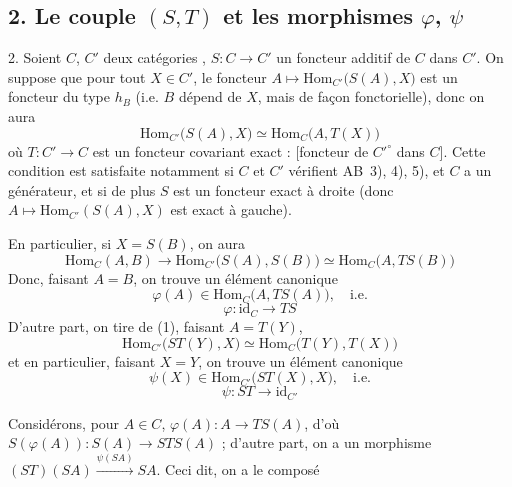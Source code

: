 \documentclass[11pt,a4paper]{article}
\begin{document}
\subsection*{2. Le couple $(S, T)$ et les morphismes $\varphi$, $\psi$}

2. Soient $C$, $C'$ deux catégories  ,
$S : C \to C'$ un foncteur additif de $C$ dans $C'$. On suppose que pour tout
 $X \in C'$, le foncteur
$A \mapsto \mathrm{Hom}_{C'}\bigl( S(A), X \bigr)$ est un foncteur du type
 $h_{B}$ (i.e. $B$ dépend de $X$, mais de façon
fonctorielle), donc on aura
\[
  \mathrm{Hom}_{C'}\bigl( S(A), X \bigr) \simeq
  \mathrm{Hom}_{C}\bigl( A, T(X) \bigr)
  \tag{1}
\]
où $T : C' \to C$ est un foncteur covariant exact : [foncteur de $C'^{\circ}$
dans $C$]. Cette condition est \struck{\ill{}} satisfaite notamment si $C$ et
$C'$ vérifient AB~3), 4), 5), et $C$ a un générateur, et si de plus
\struck{\ill{}} $S$ est un foncteur exact à droite (donc
$A \mapsto \mathrm{Hom}_{C'}(S(A), X)$ est exact à gauche).


En particulier, si $X = S(B)$, on aura
\[
  \mathrm{Hom}_{C}(A, B) \longrightarrow
  \mathrm{Hom}_{C'}\bigl( S(A), S(B) \bigr) \simeq
  \mathrm{Hom}_{C}\bigl( A, TS(B) \bigr)
  \tag{2}
\]
Donc, faisant $A = B$, on trouve un élément canonique
\[
  \varphi(A) \in \mathrm{Hom}_{C}\bigl( A, TS(A) \bigr) , \quad \text{i.e.}
  \tag{3}
\]
\[
  \varphi : \mathrm{id}_{C} \longrightarrow TS
  \tag{3 bis}
\]
D'autre part, on  tire de (1), faisant $A = T(Y)$,
\[
  \mathrm{Hom}_{C'}\bigl( ST(Y), X \bigr) \simeq
  \mathrm{Hom}_{C}\bigl( T(Y), T(X) \bigr)
  \tag{4}
\]
et en particulier, faisant $X = Y$, on trouve un élément canonique
\[
  \psi(X) \in \mathrm{Hom}_{C'}\bigl( ST(X), X \bigr) , \quad \text{i.e.}
  \tag{5}
\]
\[
  \psi : ST \longrightarrow \mathrm{id}_{C'}
  \tag{5 bis}
\]

Considérons, pour $A \in C$, $\varphi(A) : A \to TS(A)$, d'où
$S(\varphi(A)) : S(A) \to STS(A)$ ; d'autre part, on a un morphisme
$(ST)(SA) \xrightarrow{\psi(SA)} SA$. Ceci dit, on a le composé

\end{document}
